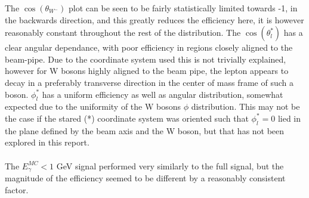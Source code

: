 The $\cos{({\theta}_{{W}^{-}})}$ plot can be seen to be fairly statistically limited towards -1, in the backwards direction, and this greatly reduces the efficiency here, it is however reasonably constant throughout the rest of the distribution. The $\cos{({\theta}_{l}^{*})}$ has a clear angular dependance, with poor efficiency in regions closely aligned to the beam-pipe. Due to the coordinate system used this is not trivially explained, however for W bosons highly aligned to the beam pipe, the lepton appears to decay in a preferably transverse direction in the center of mass frame of such a boson. ${\phi}_{l}^{*}$ has a uniform efficiency as well as angular distribution, somewhat expected due to the uniformity of the W bosons ${\phi}$ distribution. This may not be the case if the stared (*) coordinate system was oriented such that ${\phi}_{l}^{*} = 0$ lied in the plane defined by the beam axis and the W boson, but that has not been explored in this report.
\\\\
The ${E}_{\gamma}^{MC} < 1$ GeV signal performed very similarly to the full signal, but the magnitude of the efficiency seemed to be different by a reasonably consistent factor.

